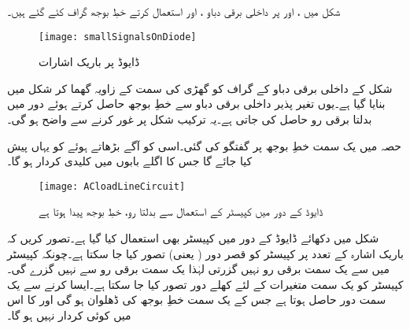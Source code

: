 شکل   میں ،    اور    پر داخلی برقی دباو ،  اور  استعمال کرتے خطِ بوجھ گراف کئے گئے ہیں۔
\begin{figure}
\centering
\texttt{[image: smallSignalsOnDiode]}
\caption{ ڈایوڈ پر باریک اشارات}
\label{شکل_ڈایوڈ_پر_باریک_اشارات}
\end{figure}

شکل  کے داخلی برقی دباو کے گراف کو گھڑی کی سمت    کے زاویہ گھما کر شکل   میں بنایا گیا ہے۔یوں تغیر پذیر داخلی برقی دباو سے خطِ بوجھ حاصل کرتے ہوئے دور میں بدلتا برقی رو حاصل کی جاتی ہے۔یہ  ترکیب شکل پر غور کرنے سے واضح ہو گی۔


حصہ   میں یک سمت خطِ بوجھ پر گفتگو کی گئی۔اسی کو آگے بڑھاتے ہوئے   کو یہاں پیش کیا جائے گا جس کا اگلے بابوں میں کلیدی کردار ہو گا۔
\begin{figure}
\centering
\texttt{[image: ACloadLineCircuit]}
\caption{ڈایوڈ کے دور میں کپیسٹر کے استعمال سے بدلتا رو، خطِ بوجھ پیدا ہوتا ہے}
\label{شکل_ڈایوڈ_بدلتے_بار_کا_دور}
\end{figure}
شکل   میں دکھائے ڈایوڈ کے دور میں کپیسٹر بھی استعمال کیا گیا ہے۔تصور کریں کہ باریک اشارہ  کے تعدد پر کپیسٹر کو قصر دور ( یعنی) تصور کیا جا سکتا ہے۔چونکہ کپیسٹر میں سے یک سمت برقی رو نہیں گزرتی لہٰذا یک سمت برقی رو   سے نہیں گزرے گی۔کپیسٹر کو یک سمت متغیرات کے لئے کھلے دور تصور کیا جا سکتا ہے۔ایسا کرنے سے یک سمت دور حاصل ہوتا ہے جس کے  یک سمت خطِ بوجھ کی ڈھلوان  ہو گی اور   کا اس میں کوئی کردار نہیں ہو گا۔

